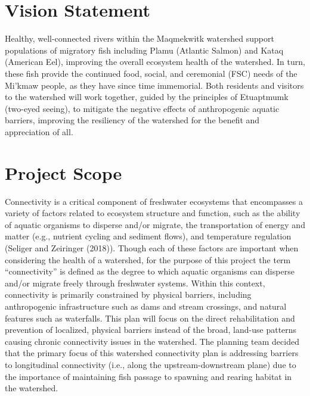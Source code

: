 \documentclass[
  letterpaper,
  DIV=11,
  numbers=noendperiod]{scrreprt}
\begin{document}
\section*{Vision Statement}\label{vision-statement}


Healthy, well-connected rivers within the Maqmekwitk watershed support
populations of migratory fish including Plamu (Atlantic Salmon) and
Kataq (American Eel), improving the overall ecosystem health of the
watershed. In turn, these fish provide the continued food, social, and
ceremonial (FSC) needs of the Mi'kmaw people, as they have since time
immemorial. Both residents and visitors to the watershed will work
together, guided by the principles of Etuaptmumk (two-eyed seeing), to
mitigate the negative effects of anthropogenic aquatic barriers,
improving the resiliency of the watershed for the benefit and
appreciation of all.

\section*{Project Scope}\label{project-scope}


Connectivity is a critical component of freshwater ecosystems that
encompasses a variety of factors related to ecosystem structure and
function, such as the ability of aquatic organisms to disperse and/or
migrate, the transportation of energy and matter (e.g., nutrient cycling
and sediment flows), and temperature regulation (Seliger and Zeiringer
(2018)). Though each of these factors are important when considering the
health of a watershed, for the purpose of this project the term
``connectivity'' is defined as the degree to which aquatic organisms can
disperse and/or migrate freely through freshwater systems. Within this
context, connectivity is primarily constrained by physical barriers,
including anthropogenic infrastructure such as dams and stream
crossings, and natural features such as waterfalls. This plan will focus
on the direct rehabilitation and prevention of localized, physical
barriers instead of the broad, land-use patterns causing chronic
connectivity issues in the watershed. The planning team decided that the
primary focus of this watershed connectivity plan is addressing barriers
to longitudinal connectivity (i.e., along the upstream-downstream plane)
due to the importance of maintaining fish passage to spawning and
rearing habitat in the watershed.
\end{document}

